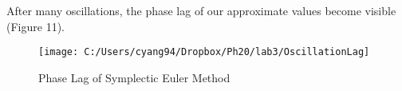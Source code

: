 \documentclass[english]{article}
\begin{document}
After many oscillations, the phase lag of our approximate values become
visible (Figure 11).

\begin{figure}[H]


\caption{Phase Lag of Symplectic Euler Method}


\noindent \begin{centering}
\texttt{[image: C:/Users/cyang94/Dropbox/Ph20/lab3/OscillationLag]}
\par\end{centering}

\end{figure}
\end{document}
